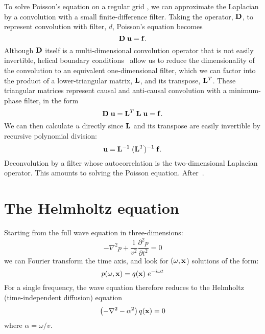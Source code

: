 \par
To solve Poisson's equation on a regular grid
\cite{Claerbout.sep.95.jon1}, we can approximate the 
Laplacian by a convolution with a small finite-difference filter.
Taking the operator, ${\bf D}$, to represent convolution with filter,
$d$, Poisson's equation becomes
\begin{equation}
{\bf D \; u}={\bf f}.
\end{equation}
Although ${\bf D}$ itself is a multi-dimensional convolution operator
that is not easily invertible, helical boundary
conditions~\cite{Claerbout.sep.95.jon1} allow us to reduce the
dimensionality of the convolution to an equivalent one-dimensional
filter, which we can factor into the product of a lower-triangular
matrix, ${\bf L}$, and its transpose, ${\bf L}^T$. These triangular
matrices represent causal and anti-causal convolution with a
minimum-phase filter, in the form
\begin{equation}
{\bf D \; u}={\bf L}^T \; {\bf L} \; {\bf u}={\bf f}.
\end{equation}
We can then calculate $u$ directly since ${\bf L}$ and its transpose
are easily invertible by recursive polynomial division:
\begin{equation}
{\bf u} = {\bf L}^{-1} \; ({\bf L}^T)^{-1} \; {\bf f}.
\end{equation}
 { 
Deconvolution by a filter whose autocorrelation
is the two-dimensional Laplacian operator.
This amounts to solving the Poisson equation.
After~.
}

\section{The Helmholtz equation}

Starting from the full wave equation in three-dimensions:
\begin{equation}
-\nabla^2 p + \frac{1}{v^2} \frac{\partial^2 p}{\partial t^2}=0
\end{equation}
we can Fourier transform the time axis, and look for $(\omega, {\bf x}$)
solutions of the form:
\begin{equation}
p(\omega,{\bf x}) = q ({\bf x}) \; e^{-i \omega t}
\end{equation}
For a single frequency, the wave equation therefore reduces to the
Helmholtz (time-independent diffusion) equation
\begin{equation} \label{eqn:helmholtz}
\left(-\nabla^2 - \alpha^2\right) q({\bf x})=0
\end{equation}
where $\alpha=\omega/v$.

